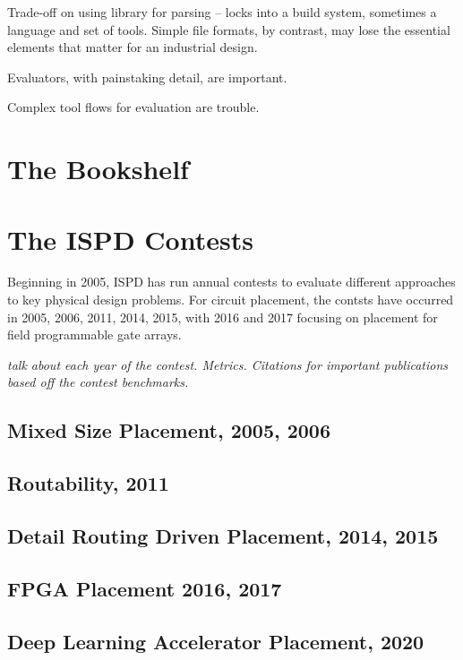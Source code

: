 \documentclass[sigconf]{acmart}
\begin{document}
Trade-off on using library for parsing -- locks into a build
system, sometimes a language and set of tools.  Simple
file formats, by contrast, may lose the essential elements
that matter for an industrial design.

Evaluators, with painstaking detail, are important.

Complex tool flows for evaluation are trouble.

\section{The Bookshelf}

\cite{Caldwell000693}\cite{umichbookshelf}


\section{The ISPD Contests}

Beginning in 2005, ISPD has run annual contests to evaluate
different approaches to key physical design problems.  For circuit
placement, the contsts have occurred in 2005, 2006, 2011, 2014,
2015, with 2016 and 2017 focusing on placement for
field programmable gate arrays.

{\em talk about each year of the contest.  Metrics.  Citations
  for important publications based off the contest benchmarks.}

\subsection{Mixed Size Placement, 2005, 2006}

\subsection{Routability, 2011}

\subsection{Detail Routing Driven Placement, 2014, 2015}

\subsection{FPGA Placement 2016, 2017}

\subsection{Deep Learning Accelerator Placement, 2020}






\balance


\end{document}
